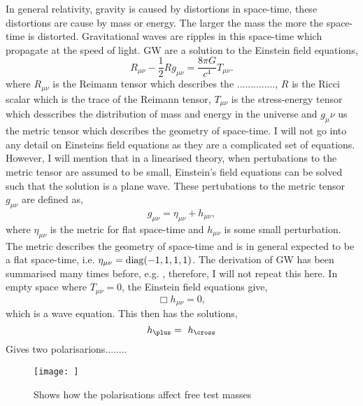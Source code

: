 In general relativity, gravity is caused by distortions in space-time, these distortions are cause by mass or energy. 
The larger the mass the more the space-time is distorted.
Gravitational waves are ripples in this space-time which propagate at the speed of light. 
\ac{GW} are a solution to the Einstein field equations,
\begin{equation}
    R_{\mu \nu} - \frac{1}{2}R g_{\mu \nu} = \frac{8 \pi G}{c^4}T_{\mu \nu}.
\end{equation}
where $R_{\mu \nu}$ is the Reimann tensor which describes the .............., $R$ is the Ricci scalar which is the trace of the Reimann tensor, $T_{\mu \nu}$ is the stress-energy tensor which desscribes the distribution of mass and energy in the universe and $g_\mu \nu$ us the metric tensor which describes the geometry of space-time.
I will not go into any detail on Einsteins field equations as they are a complicated set of equations.
However, I will mention that in a linearised theory, when pertubations to the metric tensor are assumed to be small, Einstein's field equations can be solved such that the solution is a plane wave. 
These pertubations to the metric tensor $g_{\mu \nu}$ are defined as,
\begin{equation}
    g_{\mu \nu} = \eta_{\mu \nu} + h_{\mu \nu},
\end{equation}
where $ \eta_{\mu \nu}$ is the metric for flat space-time and $h_{\mu \nu}$ is some small perturbation. 
The metric describes the geometry of space-time and is in general expected to be a flat space-time, i.e. $\eta_{\mu \nu} = \rm{diag}(-1,1,1,1)$.
The derivation of \ac{GW} has been summarised many times before, e.g. \cite{}, therefore, I will not repeat this here.
In empty space where $T_{\mu \nu} = 0$, the Einstein field equations give, 
\begin{equation}
    \Box h_{\mu \nu} = 0,
\end{equation}
which is a wave equation. 
This then has the solutions,
\begin{equation}
    h_{\plus} = \
    h_{\cross}
\end{equation}
Gives two polarisarions........
\begin{figure}[h]
    \centering
    \texttt{[image: ]}
    \caption{Shows how the polarisations affect free test masses}
    \label{gw:polarisations}
\end{figure}

